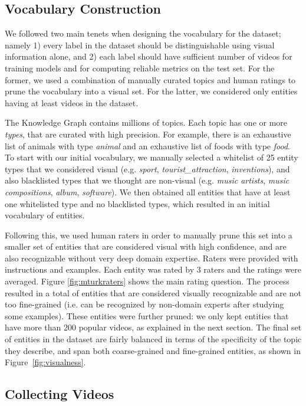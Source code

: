 \documentclass{sig-alternate-05-2015}
\begin{document}
\subsection{Vocabulary Construction}

We followed two main tenets when designing the vocabulary for the dataset;
namely 1) every label in the dataset should be distinguishable using visual information
alone, and 2) each label should have sufficient number of videos for training models
and for computing reliable metrics on the test set. For the former, we used a combination of manually
curated topics and human ratings to prune the vocabulary into a visual set. For the latter, we
considered only entities having at least  videos in the dataset.

The Knowledge Graph contains millions of topics. Each topic has one or more {\it types},
that are curated with high precision. For example, there is an exhaustive list of
animals with type {\it animal} and an exhaustive list of foods with type {\it food}.
To start with our initial vocabulary, we manually selected a whitelist of 25
entity types that we considered visual (e.g. {\it sport},
{\it tourist\_attraction}, {\it inventions}), and also blacklisted types that
we thought are non-visual (e.g. {\it music artists}, {\it music compositions}, {\it album}, {\it software}).
We then obtained all entities that have at least one whitelisted type and no
blacklisted types, which resulted in an initial vocabulary of  entities.

Following this, we used human raters in order to manually
prune this set into a smaller set of entities that are considered visual with high
confidence, and are also recognizable without very deep domain expertise. Raters were provided with instructions and examples. Each entity was
rated by 3 raters and the ratings were averaged. Figure \ref{fig:mturkraters} shows the main rating question.
The process resulted in a total of  entities that are considered visually recognizable
and are not too fine-grained (i.e. can be recognized by non-domain experts after studying some examples).
These entities were further pruned: we only kept entities that have more than 200 popular videos,
as explained in the next section.  The final set of entities in the dataset are
fairly balanced in terms of the specificity of the topic they describe, and span
both coarse-grained and fine-grained entities, as shown in Figure~\ref{fig:visualness}.



\subsection{Collecting Videos}
\end{document}
